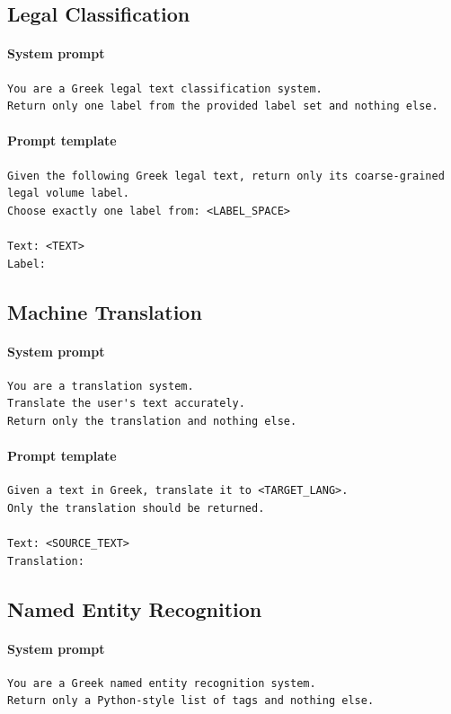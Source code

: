 \documentclass[sigconf,review,anonymous]{acmart}
\begin{document}
\subsection{Legal Classification}
\paragraph{System prompt}
\begin{verbatim}
You are a Greek legal text classification system.
Return only one label from the provided label set and nothing else.
\end{verbatim}
\paragraph{Prompt template}
\begin{verbatim}
Given the following Greek legal text, return only its coarse-grained legal volume label.
Choose exactly one label from: <LABEL_SPACE>

Text: <TEXT>
Label:
\end{verbatim}

\subsection{Machine Translation}
\paragraph{System prompt}
\begin{verbatim}
You are a translation system.
Translate the user's text accurately.
Return only the translation and nothing else.
\end{verbatim}
\paragraph{Prompt template}
\begin{verbatim}
Given a text in Greek, translate it to <TARGET_LANG>.
Only the translation should be returned.

Text: <SOURCE_TEXT>
Translation:
\end{verbatim}

\subsection{Named Entity Recognition}
\paragraph{System prompt}
\begin{verbatim}
You are a Greek named entity recognition system.
Return only a Python-style list of tags and nothing else.
\end{verbatim}
\end{document}
